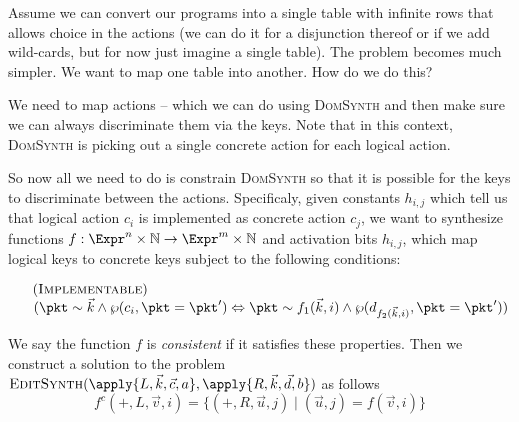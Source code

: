 Assume we can convert our programs into a single table with infinite
rows that allows choice in the actions (we can do it for a disjunction
thereof or if we add wild-cards, but for now just imagine a single
table). The problem becomes much simpler. We want to map one table
into another. How do we do this?

We need to map actions -- which we can do using \textsc{DomSynth} and
then make sure we can always discriminate them via the keys. Note that
in this context, \textsc{DomSynth} is picking out a single concrete
action for each logical action.

So now all we need to do is constrain \textsc{DomSynth} so that it is
possible for the keys to discriminate between the actions.
%
%
Specificaly, given constants $h_{i,j}$ which tell us that logical
action $c_i$ is implemented as concrete action $c_j$, we want to
synthesize functions $f : \Expr^n \times \mathbb N \to \Expr^m \times \mathbb N $ and activation
bits $h_{i,j}$, which map logical keys to concrete keys subject to the
following conditions:
\begin{enumerate}[align=left]
\item[$(\textsc{Implementable})$] \((\pkt \sim \vec{k} \wedge \wp(c_i, \pkt = \pkt') \Leftrightarrow \pkt \sim f_1(\vec k, i) \wedge \wp(d_{f_2(\vec k, i)}, \pkt = \pkt'))\)
\end{enumerate}


We say the function $f$ is \emph{consistent} if it satisfies these
properties. Then we construct a solution to the problem
$\textsc{EditSynth}(\apply{L, \vec k, \vec c, a}, \apply{R, \vec k,
  \vec d, b})$ as follows
\[ f^c(+,L,\vec v, i) = \{(+,R,\vec u, j) \mid (\vec u,j) = f(\vec v,i) \} \]

